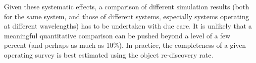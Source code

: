 Given these systematic effects, a comparison of different simulation results (both for the same system,
and those of different systems, especially systems operating at different wavelengths) has to be undertaken
with due care. It is unlikely that a meaningful quantitative comparison can be pushed beyond a level
of a few percent (and perhaps as much as 10\%). In practice, the completeness of a given operating survey
is best estimated using the object re-discovery rate. 


